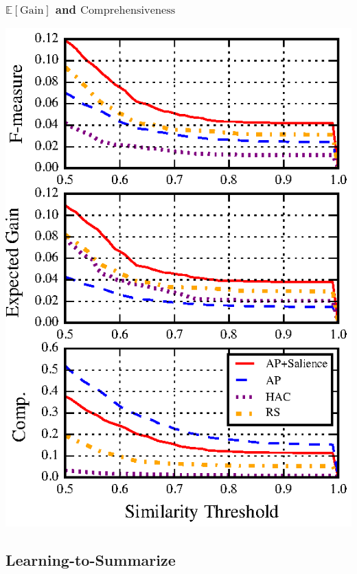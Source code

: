 \begin{frame}
\frametitle{$\mathbb{E}[\mathrm{Gain}]$ and $\mathrm{Comprehensiveness}$}
\begin{center}
\includegraphics[scale=.7]{images/nuggets-metrics2.eps}
\end{center}
\end{frame}

\subsection{Learning-to-Summarize}


